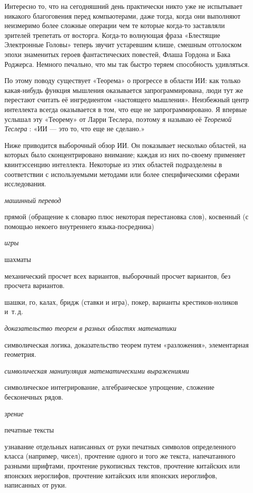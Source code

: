 \documentclass[../main.tex]{subfiles}
\begin{document}
Интересно то, что на сегодняшний день практически никто уже не испытывает никакого благоговения перед компьютерами, даже тогда, когда они выполняют неизмеримо более сложные операции чем те которые когда-то заставляли зрителей трепетать от восторга. Когда-то волнующая фраза «Блестящие Электронные Головы» теперь звучит устаревшим клише, смешным отголоском эпохи знаменитых героев фантастических повестей, Флаша Гордона и Бака Роджерса. Немного печально, что мы так быстро теряем способность удивляться.

По этому поводу существует «Теорема» о прогрессе в области ИИ: как только какая-нибудь функция мышления оказывается запрограммирована, люди тут же перестают считать её ингредиентом «настоящего мышления». Неизбежный центр интеллекта всегда оказывается в том, что еще не запрограммировано. Я впервые услышал эту «Теорему» от Ларри Теслера, поэтому я называю её \emph{Теоремой Теслера} : «ИИ --- это то, что еще не сделано.»

Ниже приводится выборочный обзор ИИ\@. Он показывает несколько областей, на которых было сконцентрировано внимание; каждая из них по-своему применяет квинтэссенцию интеллекта. Некоторые из этих областей подразделены в соответствии с используемыми методами или более специфическими сферами исследования.

\emph{машинный перевод}

прямой (обращение к словарю плюс некоторая перестановка слов), косвенный (с помощью некоего внутреннего языка-посредника)

\emph{игры}

шахматы

механический просчет всех вариантов, выборочный просчет вариантов, без просчета вариантов.

шашки, го, калах, бридж (ставки и игра), покер, варианты крестиков-ноликов и~т.\,д.

\emph{доказательство теорем в разных областях математики}

символическая логика, доказательство теорем путем «разложения», элементарная геометрия.

\emph{символическая манипуляция математическими выражениями}

символическое интегрирование, алгебраическое упрощение, сложение бесконечных рядов.

\emph{зрение}

печатные тексты

узнавание отдельных написанных от руки печатных символов определенного класса (например, чисел), прочтение одного и того же текста, напечатанного разными шрифтами, прочтение рукописных текстов, прочтение китайских или японских иероглифов, прочтение китайских или японских иероглифов, написанных от руки.
\end{document}
